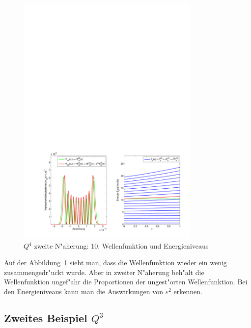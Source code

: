 \begin{refsection}
\begin{figure}	%
\centering
\includegraphics[width=0.8\textwidth]{anharmonisch/images/x4/Stoerung2Wellenfunktion.pdf}
\caption{$Q^4$ zweite N"aherung: 10. Wellenfunktion und Energieniveaus  
\label{skript:x4_Stoerung2Wellenfunktion}}
\end{figure}

Auf der Abbildung~\ref{skript:x4_Stoerung2Wellenfunktion} sieht man, dass die
Wellenfunktion wieder ein wenig zusammengedr"uckt wurde.
Aber in zweiter N"aherung beh"alt die Wellenfunktion ungef"ahr die Proportionen
der ungest"orten Wellenfunktion.
Bei den Energieniveaus kann man die Auswirkungen von $\varepsilon^2$ erkennen.

\subsection{Zweites Beispiel $Q^3$}


\end{refsection}
